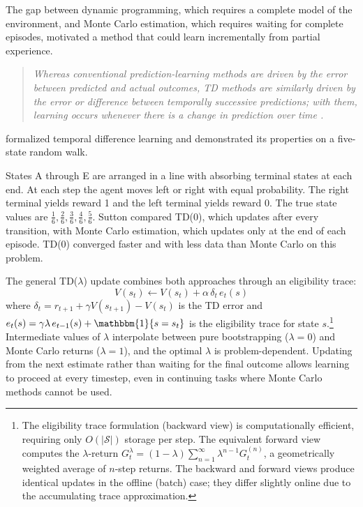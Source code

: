 The gap between dynamic programming, which requires a complete model of the environment, and Monte Carlo estimation, which requires waiting for complete episodes, motivated a method that could learn incrementally from partial experience.

\begin{quote}\itshape
Whereas conventional prediction-learning methods are driven by the error between predicted and actual outcomes, TD methods are similarly driven by the error or difference between temporally successive predictions; with them, learning occurs whenever there is a change in prediction over time \citep{sutton1988}.
\end{quote}

\citet{sutton1988} formalized temporal difference learning and demonstrated its properties on a five-state random walk.

States A through E are arranged in a line with absorbing terminal states at each end. At each step the agent moves left or right with equal probability. The right terminal yields reward 1 and the left terminal yields reward 0. The true state values are $\frac{1}{6}, \frac{2}{6}, \frac{3}{6}, \frac{4}{6}, \frac{5}{6}$. Sutton compared TD(0), which updates after every transition, with Monte Carlo estimation, which updates only at the end of each episode. TD(0) converged faster and with less data than Monte Carlo on this problem.

The general TD($\lambda$) update combines both approaches through an eligibility trace:
\begin{equation}
V(s_t) \leftarrow V(s_t) + \alpha \, \delta_t \, e_t(s)
\end{equation}
where $\delta_t = r_{t+1} + \gamma V(s_{t+1}) - V(s_t)$ is the TD error and $e_t(s) = \gamma \lambda \, e_{t-1}(s) + \mathbbm{1}\{s = s_t\}$ is the eligibility trace for state $s$.\footnote{The eligibility trace formulation (backward view) is computationally efficient, requiring only $O(|\mathcal{S}|)$ storage per step. The equivalent forward view computes the $\lambda$-return $G_t^\lambda = (1-\lambda) \sum_{n=1}^{\infty} \lambda^{n-1} G_t^{(n)}$, a geometrically weighted average of $n$-step returns. The backward and forward views produce identical updates in the offline (batch) case; they differ slightly online due to the accumulating trace approximation.} Intermediate values of $\lambda$ interpolate between pure bootstrapping ($\lambda = 0$) and Monte Carlo returns ($\lambda = 1$), and the optimal $\lambda$ is problem-dependent. Updating from the next estimate rather than waiting for the final outcome allows learning to proceed at every timestep, even in continuing tasks where Monte Carlo methods cannot be used.

